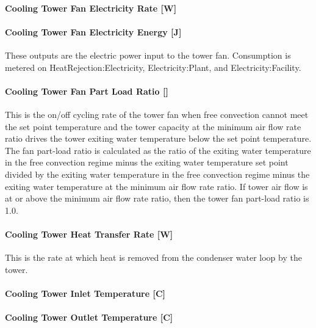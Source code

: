\paragraph{Cooling Tower Fan Electricity Rate {[}W{]}}\label{cooling-tower-fan-electric-power-w-3}

\paragraph{Cooling Tower Fan Electricity Energy {[}J{]}}\label{cooling-tower-fan-electric-energy-j-3}

These outputs are the electric power input to the tower fan. Consumption is metered on HeatRejection:Electricity, Electricity:Plant, and Electricity:Facility.

\paragraph{Cooling Tower Fan Part Load Ratio {[]}}\label{cooling-tower-fan-part-load-ratio}

This is the on/off cycling rate of the tower fan when free convection cannot meet the set point temperature and the tower capacity at the minimum air flow rate ratio drives the tower exiting water temperature below the set point temperature. The fan part-load ratio is calculated as the ratio of the exiting water temperature in the free convection regime minus the exiting water temperature set point divided by the exiting water temperature in the free convection regime minus the exiting water temperature at the minimum air flow rate ratio. If tower air flow is at or above the minimum air flow rate ratio, then the tower fan part-load ratio is 1.0.

\paragraph{Cooling Tower Heat Transfer Rate {[}W{]}}\label{cooling-tower-heat-transfer-rate-w-3}

This is the rate at which heat is removed from the condenser water loop by the tower.

\paragraph{Cooling Tower Inlet Temperature {[}C{]}}\label{cooling-tower-inlet-temperature-c-3}

\paragraph{Cooling Tower Outlet Temperature {[}C{]}}\label{cooling-tower-outlet-temperature-c-3}

